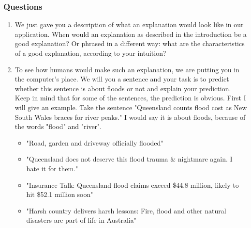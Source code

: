 \subsubsection*{Questions}
\begin{enumerate}
    \item We just gave you a description of what an explanation would look like in our application. When would an explanation as described in the introduction be a good explanation? Or phrased in a different way: what are the characteristics of a good explanation, according to your intuition?

    \item To see how humans would make such an explanation, we are putting you in the computer's place. We will you a sentence and your task is to predict whether this sentence is about floods or not and explain your prediction. Keep in mind that for some of the sentences, the prediction is obvious.
    First I will give an example. Take the sentence "Queensland counts flood cost as New South Wales braces for river peaks." I would say it is about floods, because of the words "flood" and "river".
    \begin{itemize}
        \item "Road, garden and driveway officially flooded"
        \item "Queensland does not deserve this flood trauma \& nightmare again. I hate it for them."
        \item "Insurance Talk: Queensland flood claims exceed \$44.8 million, likely to hit \$52.1 million soon"
        \item "Harsh country delivers harsh lessons: Fire, flood and other natural disasters are part of life in Australia"
    \end{itemize}


\end{enumerate}
